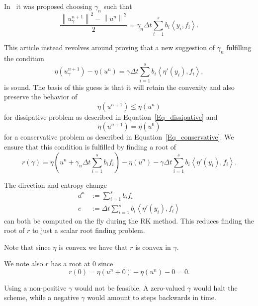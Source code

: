\documentclass{article}
\newcommand{\norm}[1]{\left\lVert#1\right\rVert}
\newcommand{\inner}[2]{\left< #1 , #2 \right>}
\begin{document}
    \vspace*{5mm}
    In~\cite{ketcheson2019relaxation} it was proposed choosing \(\gamma_n\) such that
    \[ \frac{\norm{u^{n+1}_{\gamma}}^2 - \norm{u^{n}}^2}{2} = \gamma_n \Delta t \sum_{i=1}^{s} b_i \inner{y_i}{f_i}.\]

    This article instead revolves around proving that a new suggestion of \(\gamma_n\) fulfilling the condition
    \[  \eta (u^{n+1}_{\gamma}) - \eta (u^{n}) = \gamma \Delta t \sum_{i=1}^{s} b_i \inner{\eta'(y_i)}{f_i},\]
    is sound. The basis of this guess is that it will retain the convexity and also preserve the behavior of
    \[
        \eta(u^{n+1}) \leq \eta(u^{n})
    \]
    for dissipative problem as described in Equation~\ref{Eq_dissipative} and
    \[
        \eta(u^{n+1}) = \eta(u^{0})
    \]
    for a conservative problem as described in Equation~\ref{Eq_conservative}. We ensure that this condition is fulfilled by finding a root of
    \begin{equation}\label{Eq_r}
        r(\gamma) = \eta (u^{n} + \gamma_n \Delta t \sum_{i=1}^{s} b_i f_i) - \eta (u^{n}) - \gamma \Delta t \sum_{i=1}^{s} b_i \inner{\eta'(y_i)}{f_i}.
    \end{equation}

    The direction and entropy change
    \begin{align*}
        d^n &:= \sum^s_{i=1}b_if_i \\
        e   &:= \Delta t \sum^s_{i=1} b_i \inner{\eta'(y_i)}{f_i}
    \end{align*}
    can both be computed on the fly during the RK method. This reduces finding the root of \(r\) to just a scalar root finding problem.

    Note that since \(\eta\) is convex we have that \(r\) is convex in \(\gamma\).

    We note also \(r\) has a root at \(0\) since
    \begin{equation}\label{Eq_r_at_0}
        r(0) = \eta (u^{n} + 0) - \eta (u^{n}) - 0 = 0.
    \end{equation}

    Using a non-positive \(\gamma\) would not be feasible. A zero-valued \(\gamma\) would halt the scheme, while a negative \(\gamma\) would amount to steps backwards in time.

%
\end{document}
